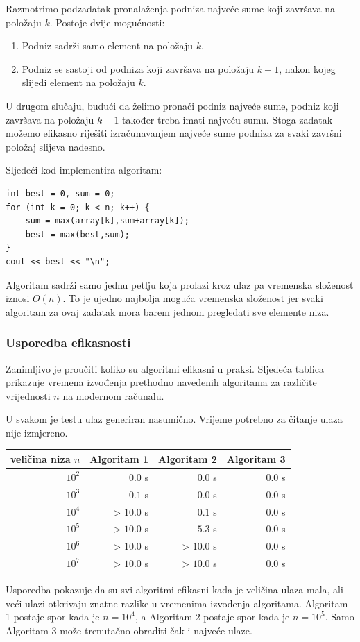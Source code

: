 Razmotrimo podzadatak pronalaženja podniza najveće sume
koji završava na položaju $k$.
Postoje dvije mogućnosti:
\begin{enumerate}
\item Podniz sadrži samo element na položaju $k$.
\item Podniz se sastoji od podniza koji završava
na položaju $k-1$, nakon kojeg slijedi element na položaju $k$.
\end{enumerate}

U drugom slučaju, budući da želimo
pronaći podniz najveće sume,
podniz koji završava na položaju $k-1$
također treba imati najveću sumu.
Stoga zadatak možemo efikasno riješiti
izračunavanjem najveće sume podniza
za svaki završni položaj slijeva nadesno.

Sljedeći kod implementira algoritam:
\begin{lstlisting}
int best = 0, sum = 0;
for (int k = 0; k < n; k++) {
    sum = max(array[k],sum+array[k]);
    best = max(best,sum);
}
cout << best << "\n";
\end{lstlisting}

Algoritam sadrži samo jednu petlju
koja prolazi kroz ulaz
pa vremenska složenost iznosi $O(n)$.
To je ujedno najbolja moguća vremenska složenost
jer svaki algoritam za ovaj zadatak
mora barem jednom pregledati sve elemente niza.

\subsubsection{Usporedba efikasnosti}

Zanimljivo je proučiti koliko su algoritmi
efikasni u praksi.
Sljedeća tablica prikazuje vremena izvođenja
prethodno navedenih algoritama za različite
vrijednosti $n$ na modernom računalu.

U svakom je testu ulaz generiran nasumično.
Vrijeme potrebno za čitanje ulaza nije
izmjereno.

\begin{center}
\begin{tabular}{rrrr}
veličina niza $n$ & Algoritam 1 & Algoritam 2 & Algoritam 3 \\
\hline
$10^2$ & $0.0$ s & $0.0$ s & $0.0$ s \\
$10^3$ & $0.1$ s & $0.0$ s & $0.0$ s \\
$10^4$ & > $10.0$ s & $0.1$ s & $0.0$ s \\
$10^5$ & > $10.0$ s & $5.3$ s & $0.0$ s \\
$10^6$ & > $10.0$ s & > $10.0$ s & $0.0$ s \\
$10^7$ & > $10.0$ s & > $10.0$ s & $0.0$ s \\
\end{tabular}
\end{center}

Usporedba pokazuje da su svi algoritmi
efikasni kada je veličina ulaza mala,
ali veći ulazi otkrivaju znatne
razlike u vremenima izvođenja algoritama.
Algoritam 1 postaje spor
kada je $n=10^4$, a Algoritam 2
postaje spor kada je $n=10^5$.
Samo Algoritam 3 može trenutačno obraditi
čak i najveće ulaze.
